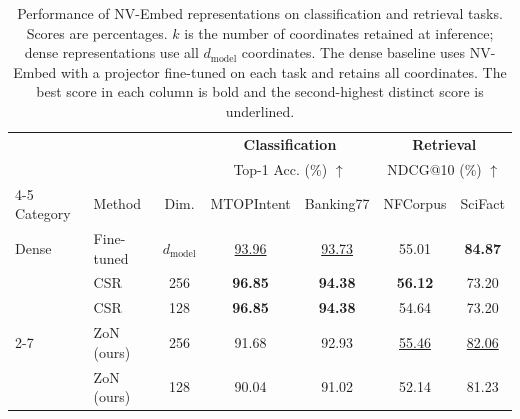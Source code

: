 \begin{table}[t]
\centering
\caption{Performance of NV-Embed representations on classification and retrieval
tasks. Scores are percentages. $k$ is the number of coordinates retained at
inference; dense representations use all $d_{\text{model}}$ coordinates.
The dense baseline uses NV-Embed with a projector fine-tuned on each task
and retains all coordinates. The best score in each column is bold and the second-highest
distinct score is underlined.}
\label{tab:embedding_results}
\small
\setlength{\tabcolsep}{3pt}
\begin{tabular}{llc|cc|cc}
\toprule
& & & \multicolumn{2}{c|}{\textbf{Classification}} & \multicolumn{2}{c}{\textbf{Retrieval}} \\
& & & \multicolumn{2}{c|}{Top-1 Acc. (\%) $\uparrow$} & \multicolumn{2}{c}{NDCG@10 (\%) $\uparrow$} \\
\cmidrule{4-5}\cmidrule{6-7}
Category & Method & Dim. & MTOPIntent & Banking77 & NFCorpus & SciFact \\
\midrule
Dense & Fine-tuned & $d_{\text{model}}$ & \underline{93.96} & \underline{93.73} & 55.01 & \textbf{84.87} \\
\midrule
& CSR & 256 & \textbf{96.85} & \textbf{94.38} & \textbf{56.12} & 73.20 \\
& CSR & 128 & \textbf{96.85} & \textbf{94.38} & 54.64 & 73.20 \\
\cmidrule{2-7}
\rowcolor{ratioDenseD!40!white}
\cellcolor{white} & ZoN (ours) & 256 & 91.68 & 92.93 & \underline{55.46} & \underline{82.06} \\
\rowcolor{ratioDenseD!40!white}
\cellcolor{white}\multirow{-4}{*}{Sparse} & ZoN (ours) & 128 & 90.04 & 91.02 & 52.14 & 81.23 \\
\bottomrule
\end{tabular}
\end{table}

